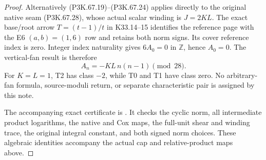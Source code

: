 \begin{proof}
Alternatively (P3K.67.19)--(P3K.67.24) applies directly to the original
native seam (P3K.67.28), whose actual scalar winding is \(J=2KL\).
The exact base/root arrow \(T=(t-1)/t\) in K33.14--15 identifies
the reference page with the E6 \((a,b)=(1,6)\) row and retains both
norm signs. Its cover reference index is zero. Integer index
naturality gives \(6A_0=0\) in \(\mathbb Z\), hence \(A_0=0\).
The vertical-fan result is therefore
\[
             A_n=-KL\,n(n-1)\pmod {28}.
 \tag{P3K.67.30}
\]
For \(K=L=1\), T2 has class \(-2\), while T0 and T1 have class
zero. No arbitrary-fan formula, source-moduli return, or separate
characteristic pair is assigned by this note.

The accompanying exact certificate is
. It checks the cyclic norm,
all intermediate product logarithms, the native and Cox maps, the
full-unit shear and winding trace, the original integral constant,
and both signed norm choices. These algebraic identities accompany
the actual cap and relative-product maps above.
\end{proof}
